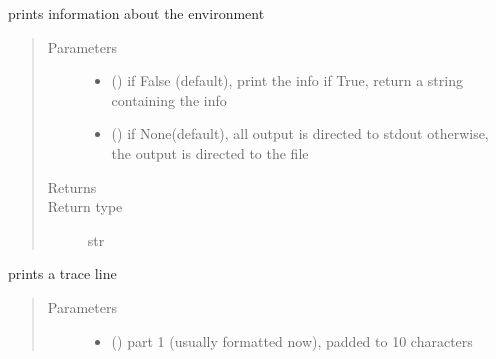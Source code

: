 \documentclass[letterpaper,10pt,english]{sphinxmanual}
\begin{document}
\begin{fulllineitems}
\begin{fulllineitems}
\end{fulllineitems}


\begin{fulllineitems}
\label{\detokenize{Reference:salabim.Environment.print_info}}
prints information about the environment
\begin{quote}\begin{description}
\item[{Parameters}] \leavevmode\begin{itemize}
\item {} 
 () \textendash{} if False (default), print the info
if True, return a string containing the info

\item {} 
 () \textendash{} if None(default), all output is directed to stdout 
otherwise, the output is directed to the file

\end{itemize}

\item[{Returns}] \leavevmode
{}

\item[{Return type}] \leavevmode
str

\end{description}\end{quote}

\end{fulllineitems}


\begin{fulllineitems}
\label{\detokenize{Reference:salabim.Environment.print_trace}}
prints a trace line
\begin{quote}\begin{description}
\item[{Parameters}] \leavevmode\begin{itemize}
\item {} 
 () \textendash{} part 1 (usually formatted  now), padded to 10 characters


\end{itemize}
\end{description}
\end{quote}
\end{fulllineitems}
\end{fulllineitems}
\end{document}
